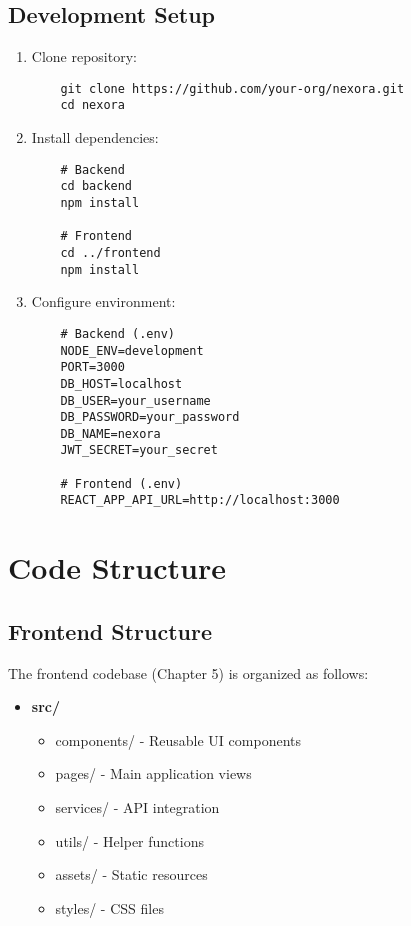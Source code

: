 \subsection{Development Setup}
\begin{enumerate}
    \item Clone repository:
    \begin{verbatim}
    git clone https://github.com/your-org/nexora.git
    cd nexora
    \end{verbatim}
    
    \item Install dependencies:
    \begin{verbatim}
    # Backend
    cd backend
    npm install
    
    # Frontend
    cd ../frontend
    npm install
    \end{verbatim}
    
    \item Configure environment:
    \begin{verbatim}
    # Backend (.env)
    NODE_ENV=development
    PORT=3000
    DB_HOST=localhost
    DB_USER=your_username
    DB_PASSWORD=your_password
    DB_NAME=nexora
    JWT_SECRET=your_secret
    
    # Frontend (.env)
    REACT_APP_API_URL=http://localhost:3000
    \end{verbatim}
\end{enumerate}

\section{Code Structure}
\subsection{Frontend Structure}
The frontend codebase (Chapter 5) is organized as follows:
\begin{itemize}
    \item \textbf{src/}
    \begin{itemize}
        \item components/ - Reusable UI components
        \item pages/ - Main application views
        \item services/ - API integration
        \item utils/ - Helper functions
        \item assets/ - Static resources
        \item styles/ - CSS files
    \end{itemize}
\end{itemize}

